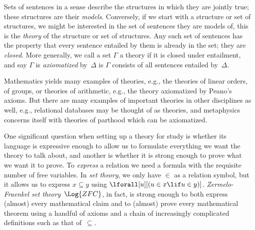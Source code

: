 Sets of sentences in a sense describe the structures in which they are
jointly true; these structures are their \emph{models}. Conversely,
if we start with a structure or set of structures, we might be
interested in the set of sentences they are models of, this is the
\emph{theory} of the structure or set of structures. Any such set of
sentences has the property that every sentence entailed by them is
already in the set; they are \emph{closed}. More generally, we call a
set $\Gamma$ a theory if it is closed under entailment, and say
$\Gamma$ is \emph{axiomatized} by~$\Delta$ is $\Gamma$ consists of all
sentences entailed by~$\Delta$.

Mathematics yields many examples of theories, e.g., the theories of
linear orders, of groups, or theories of arithmetic, e.g., the theory
axiomatized by Peano's axioms. But there are many examples of
important theories in other disciplines as well, e.g., relational
databases may be thought of as theories, and metaphysics concerns
itself with theories of parthood which can be axiomatized.

One significant question when setting up a theory for study is whether
its language is expressive enough to allow us to formulate everything
we want the theory to talk about, and another is whether it is strong
enough to prove what we want it to prove. To \emph{express} a
relation we need a formula with the requisite number of free
variables. In \emph{set theory}, we only have $\in$ as a relation
symbol, but it allows us to express $x \subseteq y$ using
$\lforall[u][(u \in x \lif u \in y)]$. \emph{Zermelo-Fraenkel set
  theory}~$\Log{ZFC}$, in fact, is strong enough to both express
(almost) every mathematical claim and to (almost) prove every
mathematical theorem using a handful of axioms and a chain of
increasingly complicated definitions such as that of~$\subseteq$.
